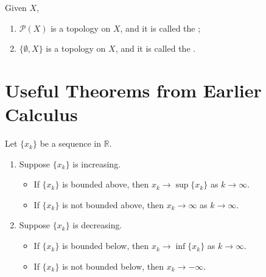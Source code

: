 \documentclass[notoc,notitlepage]{tufte-book}
\begin{document}
\begin{eg}
  Given $X$,
  \begin{enumerate}
    \item $\mathcal{P}(X)$ is a topology on $X$, and it is called the ;
    \item $\{ \emptyset, X \}$ is a topology on $X$, and it is called the .
  \end{enumerate}
\end{eg}



\appendix

\chapter{Useful Theorems from Earlier Calculus}%
\label{chp:useful_theorems_from_earlier_calculus}

\begin{thm}
\label{thm:monotone_convergence_theorem}
  Let $\{x_k\}$ be a sequence in $\mathbb{R}$.
  \begin{enumerate}
    \item Suppose $\{x_k\}$ is increasing.
      \begin{itemize}
        \item If $\{ x_k \}$ is bounded above, then $x_k \to \sup \{ x_k \}$ as $k \to \infty$.
        \item If $\{ x_k \}$ is not bounded above, then $x_k \to \infty$ as $k \to \infty$.
      \end{itemize}
    \item Suppose $\{ x_k \}$ is decreasing.
      \begin{itemize}
        \item If $\{ x_k \}$ is bounded below, then $x_k \to \inf \{ x_k \}$ as $k \to \infty$.
        \item If $\{ x_k \}$ is not bounded below, then $x_k \to -\infty$.
      \end{itemize}
  \end{enumerate}
\end{thm}


\backmatter

\pagestyle{plain}



\printindex
\end{document}
